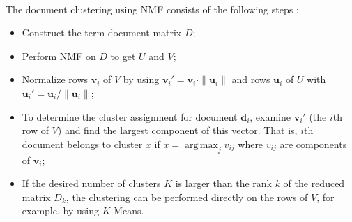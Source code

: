 \ \\

The document clustering using NMF consists of the following
steps \cite{xu2003document}:

\begin{itemize}
  \item Construct the term-document matrix $D$;
  \item Perform NMF on $D$ to get $U$ and $V$;
  \item Normalize rows $\mathbf v_i$ of $V$ by using $\mathbf v_i' = \mathbf v_i \cdot \| \mathbf u_i \|$ and rows $\mathbf u_i$ of $U$ with $\mathbf u_i' = \mathbf u_i / \| \mathbf u_i \|$;
  \item To determine the cluster assignment for document $\mathbf d_i$, examine $\mathbf v_i'$ (the $i$th row of $V$) and find the largest component of this vector. That is,
      $i$th document belongs to cluster $x$ if $x = \operatorname{arg \, max}_j v_{ij}$ where $v_{ij}$ are components of $\mathbf v_i$;
  \item If the desired number of clusters $K$ is larger than the rank $k$ of the reduced matrix $D_k$, the clustering can be performed directly on the rows of $V$, for example,
      by using $K$-Means.
\end{itemize}

